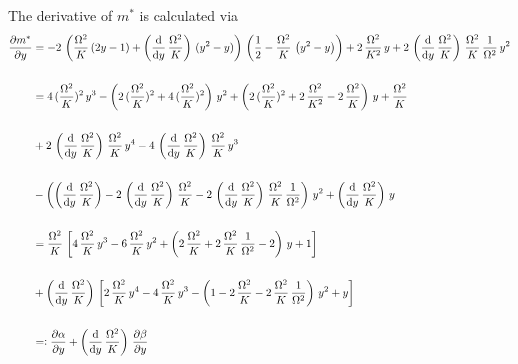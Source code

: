     The derivative of $m^*$ is calculated via
    \begin{align*}
        \frac{\partial m^*}{\partial{y}}&=-2\,\left(\frac{\Omega^2}{K}\,(2{y}-1)+\left(\frac{\text{d}}{\text{d}{y}}\,\frac{\Omega^2}{K}\right)\,({y}^2-{y})\right)\,\left( \frac{1}{2}-\frac{\Omega^2}{K}\,\left( {y}^2- {y} \right) \right)+2\,\frac{\Omega^2}{K^2}\,{y}+2\,\left(\frac{\text{d}}{\text{d}{y}}\,\frac{\Omega^2}{K}\right)\,\frac{\Omega^2}{K}\,\frac{1}{\Omega^2}\,{y}^2\\\\
        &=4\,(\frac{\Omega^2}{K})^2\,{y}^3-\left(2\,(\frac{\Omega^2}{K})^2+4\,(\frac{\Omega^2}{K})^2\right)\,{y}^2+\left( 2\,(\frac{\Omega^2}{K})^2+2\,\frac{\Omega^2}{K^2}-2\,\frac{\Omega^2}{K} \right)\,{y}+\frac{\Omega^2}{K}\\\\
        &+2\,\left(\frac{\text{d}}{\text{d}{y}}\,\frac{\Omega^2}{K}\right)\,\frac{\Omega^2}{K}\,{y}^4-4\,\left(\frac{\text{d}}{\text{d}{y}}\,\frac{\Omega^2}{K}\right)\,\frac{\Omega^2}{K}\,{y}^3\\\\
        &-\left(\left(\frac{\text{d}}{\text{d}{y}}\,\frac{\Omega^2}{K}\right)-2\,\left(\frac{\text{d}}{\text{d}{y}}\,\frac{\Omega^2}{K}\right)\,\frac{\Omega^2}{K}-2\,\left(\frac{\text{d}}{\text{d}{y}}\,\frac{\Omega^2}{K}\right)\,\frac{\Omega^2}{K}\,\frac{1}{\Omega^2}\right)\,{y}^2+\left(\frac{\text{d}}{\text{d}{y}}\,\frac{\Omega^2}{K}\right)\,{y}\\\\
        &=\frac{\Omega^2}{K}\,\left[  4\,\frac{\Omega^2}{K}\,{y}^3-6\,\frac{\Omega^2}{K}\,{y}^2+\left( 2\,\frac{\Omega^2}{K}+2\,\frac{\Omega^2}{K}\,\frac{1}{\Omega^2}-2 \right)\,{y}+1 \right]\\\\
        &+\left(\frac{\text{d}}{\text{d}{y}}\,\frac{\Omega^2}{K}\right)\,\left[2\,\frac{\Omega^2}{K}\,{y}^4-4\,\frac{\Omega^2}{K}\,{y}^3-\left(1-2\,\frac{\Omega^2}{K}-2\,\frac{\Omega^2}{K}\,\frac{1}{\Omega^2}\right)\,{y}^2+{y}\right]\\\\
        &=\vcentcolon \frac{\partial \alpha}{\partial{y}}+\left(\frac{\text{d}}{\text{d}{y}}\,\frac{\Omega^2}{K}\right)\,\frac{\partial \beta}{\partial{y}}
    \end{align*}
    

